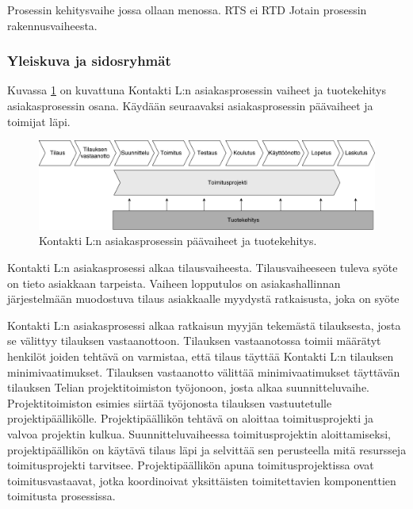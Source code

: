 \documentclass[finnish,12pt,a4paper,pdftex]{article}
\begin{document}
Prosessin kehitysvaihe jossa ollaan menossa. RTS ei RTD
Jotain prosessin rakennusvaiheesta.

\subsubsection{Yleiskuva ja sidosryhmät}

Kuvassa \ref{fig:paavaih} on kuvattuna Kontakti L:n asiakasprosessin vaiheet ja tuotekehitys asiakasprosessin osana. Käydään seuraavaksi asiakasprosessin päävaiheet ja toimijat läpi.

\begin{figure}[!h]
    \centering
    \includegraphics[scale=0.4]{images/ODI-prosessi.pdf}
    \caption{Kontakti L:n asiakasprosessin päävaiheet ja tuotekehitys.}
    \label{fig:paavaih}
\end{figure}

Kontakti L:n asiakasprosessi alkaa tilausvaiheesta. Tilausvaiheeseen tuleva syöte on tieto asiakkaan tarpeista. Vaiheen lopputulos on asiakashallinnan järjestelmään muodostuva tilaus asiakkaalle myydystä ratkaisusta, joka on syöte 



Kontakti L:n asiakasprosessi alkaa ratkaisun myyjän tekemästä tilauksesta, josta se välittyy tilauksen vastaanottoon. Tilauksen vastaanotossa toimii määrätyt henkilöt joiden tehtävä on varmistaa, että tilaus täyttää Kontakti L:n tilauksen minimivaatimukset. Tilauksen vastaanotto välittää minimivaatimukset täyttävän tilauksen Telian projektitoimiston työjonoon, josta alkaa suunnitteluvaihe.\\

Projektitoimiston esimies siirtää työjonosta tilauksen vastuutetulle projektipäällikölle. Projektipäällikön tehtävä on aloittaa toimitusprojekti ja valvoa projektin kulkua. Suunnitteluvaiheessa toimitusprojektin aloittamiseksi, projektipäällikön on käytävä tilaus läpi ja selvittää sen perusteella mitä resursseja toimitusprojekti tarvitsee. Projektipäällikön apuna toimitusprojektissa ovat toimitusvastaavat, jotka koordinoivat yksittäisten toimitettavien komponenttien toimitusta prosessissa.\\
\end{document}
